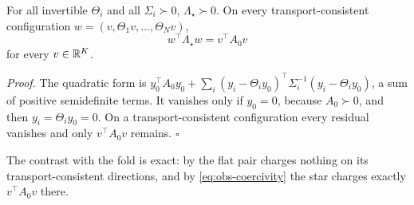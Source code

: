 For all invertible \(\Theta_i\) and all \(\Sigma_i\succ0\), \(\Lambda_\star\succ0\). On every
transport-consistent configuration \(w=(v,\Theta_1v,\dots,\Theta_Nv)\),
\begin{equation}
w^\top\Lambda_\star w=v^\top A_0v
\label{eq:obs-coercivity}
\end{equation}
for every \(v\in\mathbb R^K\). 

\noindent\emph{Proof.}
The quadratic form is
\(y_0^\top A_0y_0+\sum_i(y_i-\Theta_iy_0)^\top\Sigma_i^{-1}(y_i-\Theta_iy_0)\), a sum of
positive semidefinite terms. It vanishes only if \(y_0=0\), because \(A_0\succ0\), and
then \(y_i=\Theta_iy_0=0\). On a transport-consistent configuration every residual
vanishes and only \(v^\top A_0v\) remains. \hfill$\square$

\medskip
The contrast with the fold is exact: by  the flat pair
charges nothing on its transport-consistent directions, and by \eqref{eq:obs-coercivity} the
star charges exactly \(v^\top A_0v\) there.

